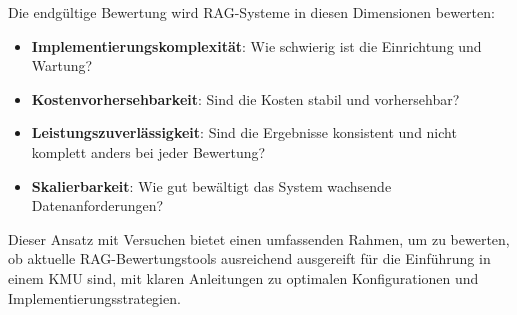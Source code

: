 Die endgültige Bewertung wird RAG-Systeme in diesen Dimensionen bewerten:
\begin{itemize}
    \item \textbf{Implementierungskomplexität}: Wie schwierig ist die Einrichtung und Wartung?
    \item \textbf{Kostenvorhersehbarkeit}: Sind die Kosten stabil und vorhersehbar?
    \item \textbf{Leistungszuverlässigkeit}: Sind die Ergebnisse konsistent und nicht komplett anders bei jeder Bewertung?
    \item \textbf{Skalierbarkeit}: Wie gut bewältigt das System wachsende Datenanforderungen?
\end{itemize}

Dieser Ansatz mit Versuchen bietet einen umfassenden Rahmen, um zu bewerten, ob aktuelle RAG-Bewertungstools ausreichend ausgereift für die Einführung in einem KMU sind, mit klaren Anleitungen zu optimalen Konfigurationen und Implementierungsstrategien.